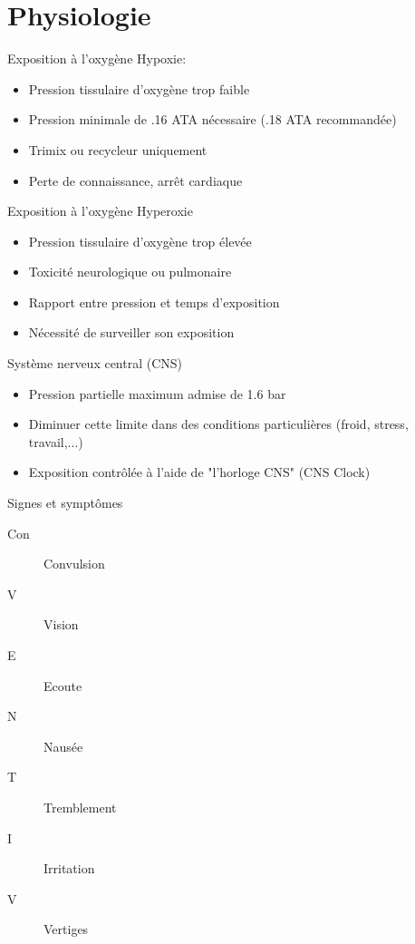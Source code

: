
\section{Physiologie}

\begin{frame}{Exposition à l'oxygène}
	Hypoxie:
	\begin{itemize}
		\item Pression tissulaire d'oxygène trop faible
		\item Pression minimale de .16 ATA nécessaire (.18 ATA recommandée)
		\item Trimix ou recycleur uniquement
		\item Perte de connaissance, arrêt cardiaque
	\end{itemize}
\end{frame}

\begin{frame}{Exposition à l'oxygène} 
	Hyperoxie
	\begin{itemize}
		\item Pression tissulaire d'oxygène trop élevée
		\item Toxicité neurologique ou pulmonaire
		\item Rapport entre pression et temps d'exposition
		\item Nécessité de surveiller son exposition
	\end{itemize}
\end{frame}

\begin{frame}{Système nerveux central (CNS)}  
	\begin{itemize}
		\item Pression partielle maximum admise de 1.6 bar
		\item Diminuer cette limite dans des conditions particulières (froid, stress, travail,...)
		\item Exposition contrôlée à l'aide de "l'horloge CNS" (CNS Clock)
	\end{itemize}
\end{frame}

\begin{frame}{Signes et symptômes}  
	\begin{description}
		\item[Con]Convulsion
		\item[V]Vision
		\item[E]Ecoute
		\item[N]Nausée
		\item[T]Tremblement
		\item[I]Irritation
		\item[V]Vertiges
	\end{description}
\end{frame}

